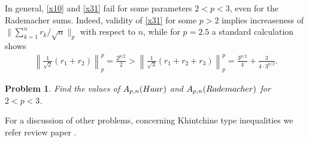 \documentclass[12pt,reqno,fleqn]{amsart}
\newtheorem{problem}{Problem}
\theoremstyle{definition}
\theoremstyle{definition}
\theoremstyle{remark}
\numberwithin{equation}{section}
\newcommand {\e }[1]{\eqref{#1}}
\begin{document}
In general, \e{x10} and \e{x31} fail for some parameters $2<p<3$, even for the Rademacher sums. Indeed, validity of \e{x31} for some $p>2$ implies increaseness of $\|\sum_{k=1}^nr_k/\sqrt n\|_p$ with respect to $n$, while for $p=2.5$ a standard calculation shows 
\begin{align*}
	\left\|\frac{1}{\sqrt{2}}\left(r_1+r_2\right)\right\|_p^p=\frac{2^{p/2}}{2}>\left\|\frac{1}{\sqrt{3}}\left(r_1+r_2+r_3\right)\right\|_p^p=\frac{3^{p/2}}{4}+\frac{3}{4\cdot 3^{p/2}}.
\end{align*}
 \begin{problem}
 	Find the values of $A_{p,n}({\rm Haar})$ and $A_{p,n}({\rm Rademacher})$ for $2<p<3$.
 \end{problem}
For a discussion of other problems, concerning Khintchine type inequalities we refer review paper \cite{PeSh}.


\end{document}
